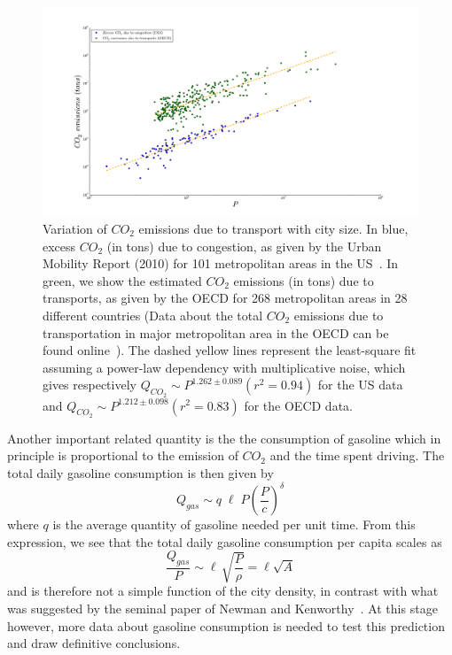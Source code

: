 %
\begin{figure}
\includegraphics[width=0.9\linewidth]{gfx/chapter-scaling/figure_3.pdf}
\caption{Variation of $CO_2$ emissions due to transport with city size. In blue, excess $CO_2$ (in tons) due to congestion, as given by the Urban Mobility Report (2010) for 101 metropolitan areas in the US~\cite{DataUSA2}. In green, we show the estimated $CO_2$ emissions (in tons) due to transports, as given by the OECD for 268 metropolitan areas in 28 different countries (Data about the total $CO_2$ emissions due to transportation in major metropolitan area in the OECD can be found online~\cite{OECD}). The dashed yellow lines represent the least-square fit assuming a power-law dependency with multiplicative noise, which gives respectively $Q_{CO_2} \sim P^{1.262 \pm 0.089} (r^2=0.94)$ for the US data and $Q_{CO_2} \sim P^{1.212 \pm 0.098} (r^2=0.83)$ for the OECD data.}
\end{figure}

Another important related quantity is the the consumption of gasoline which in principle is proportional to the emission of $CO_2$ and the time spent driving. The total daily gasoline consumption is then given by
%
\begin{equation}
Q_{gas} \sim q\; \ell\; P \left(\frac{P}{c}\right)^{\delta}
\end{equation}
%
where $q$ is the average quantity of gasoline needed per unit time. From this expression, we see that the total daily gasoline consumption per capita scales as
%
\begin{equation}
\frac{Q_{gas}}{P}\sim \ell\, \sqrt{\frac{P}{\rho}} = \ell \sqrt{A}
\end{equation}
%
and is therefore not a simple function of the city density, in contrast with what was suggested by the seminal paper of Newman and Kenworthy~\cite{Newman:1989}. At this stage however, more data about gasoline consumption is needed to test this prediction and draw definitive conclusions.


